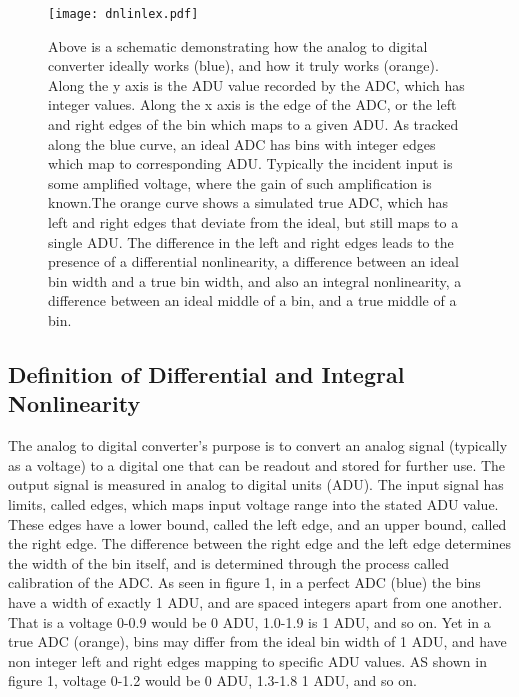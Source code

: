 \documentclass[11pt, letterpaper]{article}
\begin{document}
\begin{figure}
	\texttt{[image: dnlinlex.pdf]}
	\caption{Above is a schematic demonstrating how the analog to digital converter ideally works (blue), and how it truly works (orange). Along the y axis is the ADU value recorded by the ADC, which has integer values. Along the x axis is the edge of the ADC, or the left and right edges of the bin which maps to a given ADU. As tracked along the blue curve, an ideal ADC has bins with integer edges which map to corresponding ADU. Typically the incident input is some amplified voltage, where the gain of such amplification is known.The orange curve shows a simulated true ADC, which has left and right edges that deviate from the ideal, but still maps to a single ADU. The difference in the left and right edges leads to the presence of a differential nonlinearity, a difference between an ideal bin width and a true bin width, and also an integral nonlinearity, a difference between an ideal middle of a bin, and a true middle of a bin.}
\end{figure}

\subsection{Definition of Differential and Integral Nonlinearity}
\indent 


The analog to digital converter’s purpose is to convert an analog signal (typically as a voltage) to a digital one that can be readout and stored for further use. 
The output signal is measured in analog to digital units (ADU). 
The input signal has limits, called edges, which maps input voltage range into the stated ADU value. 
These edges have a lower bound, called the left edge, and an upper bound, called the right edge.
The difference between the right edge and the left edge determines the width of the bin itself, and is determined through the process called calibration of the ADC. 
As seen in figure 1, in a perfect ADC (blue) the bins have a width of exactly 1 ADU, and are spaced integers apart from one another. 
That is a voltage 0-0.9 would be 0 ADU, 1.0-1.9 is 1 ADU, and so on. 
Yet in a true ADC (orange), bins may differ from the ideal bin width of 1 ADU, and have non integer left and right edges mapping to specific ADU values. 
AS shown in figure 1, voltage 0-1.2 would be 0 ADU, 1.3-1.8 1 ADU, and so on. 
\indent 
\end{document}
